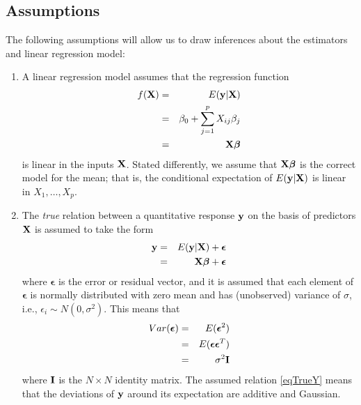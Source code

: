 \documentclass[11pt]{article}
\theoremstyle{remark}
\begin{document}
\subsection{Assumptions}
The following assumptions will allow us to draw inferences about the estimators and linear regression model:
\begin{enumerate}
\item A linear regression model assumes that the regression function
\begin{eqnarray}
f(\bold{X}) &=& E(\bold{y}|\bold{X})\nonumber\\
&=& \beta_0 + \sum_{j=1}^p X_{ij}\beta_j\nonumber\\
&=& \bold{X}\boldsymbol{\beta}\label{eqLinearRegressionFunction}
\end{eqnarray}
is linear in the inputs $\bold{X}$. Stated differently, we assume that $\bold{X}\boldsymbol{\beta}$ is the correct model for the mean; that is, the conditional expectation of $E(\bold{y}|\bold{X})$ is linear in $X_1,\hdots,X_p$.
\item The \emph{true} relation between a quantitative response $\bold{y}$ on the basis of predictors $\bold{X}$ is assumed to take the form
\begin{eqnarray}
\bold{y} &=& E(\bold{y}|\bold{X}) + \boldsymbol{\epsilon}\nonumber\\
&=& \bold{X}\boldsymbol{\beta} + \boldsymbol{\epsilon}\label{eqTrueY}
\end{eqnarray}
where $\boldsymbol{\epsilon}$ is the error or residual vector, and it is assumed that each element of $\boldsymbol{\epsilon}$ is normally distributed with zero mean and has (unobserved) variance of $\sigma$, i.e., $\epsilon_i \sim N(0,\sigma^2)$. This means that
\begin{eqnarray}
Var(\boldsymbol{\epsilon}) &=& E(\boldsymbol{\epsilon}^2)\nonumber\\
&=& E(\boldsymbol{\epsilon}\boldsymbol{\epsilon}^T)\nonumber\\
&=& \sigma^2\bold{I}\label{VarError}
\end{eqnarray}
where $\bold{I}$ is the $N \times N$ identity matrix. The assumed relation \eqref{eqTrueY} means that the deviations of $\bold{y}$ around its expectation are additive and Gaussian.
\end{enumerate}
\end{document}

